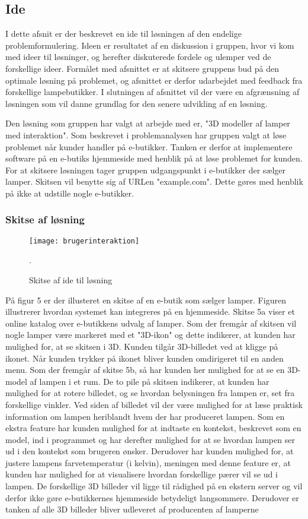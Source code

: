 \subsection{Ide}

I dette afsnit er der beskrevet en ide til løsningen af den endelige problemformulering. Ideen er resultatet af en diskussion i gruppen, hvor vi kom med ideer til løsninger, og herefter diskuterede fordele og ulemper ved de forskellige ideer. Formålet med afsnittet er at skitsere gruppens bud på den optimale løsning på problemet, og afsnittet er derfor udarbejdet med feedback fra forskellige lampebutikker. I slutningen af afsnittet vil der være en afgrænsning af løsningen som vil danne grundlag for den senere udvikling af en løsning.

Den løsning som gruppen har valgt at arbejde med er, "3D modeller af lamper med interaktion". Som beskrevet i problemanalysen har gruppen valgt at løse problemet når kunder handler på e-butikker. Tanken er derfor at implementere software på en e-butiks hjemmeside med henblik på at løse problemet for kunden. For at skitsere løsningen tager gruppen udgangspunkt i e-butikker der sælger lamper. Skitsen vil benytte sig af URLen "example.com". Dette gøres med henblik på ikke at udstille nogle e-butikker.

\subsubsection{Skitse af løsning}

\begin{figure}[H]
   \centering
   \texttt{[image: brugerinteraktion]}
   \caption{Skitse af ide til løsning}.
\end{figure}

På figur 5 er der illusteret en skitse af en e-butik som sælger lamper. Figuren illustrerer hvordan systemet kan integreres på en hjemmeside. Skitse 5a viser et online katalog over e-butikkens udvalg af lamper. Som der fremgår af skitsen vil nogle lamper være markeret med et "3D-ikon" og dette indikerer, at kunden har mulighed for, at se skitsen i 3D. Kunden tilgår 3D-billedet ved at kligge på ikonet. Når kunden trykker på ikonet bliver kunden omdirigeret til en anden menu. Som der fremgår af skitse 5b, så har kunden her mulighed for at se en 3D-model af lampen i et rum. De to pile på skitsen indikerer, at kunden har mulighed for at rotere billedet, og se hvordan belysningen fra lampen er, set fra forskellige vinkler. Ved siden af billedet vil der være mulighed for at læse praktisk information om lampen heriblandt hvem der har produceret lampen. Som en ekstra feature har kunden mulighed for at indtaste en kontekst, beskrevet som en model, ind i programmet og har derefter mulighed for at se hvordan lampen ser ud i den kontekst som brugeren ønsker. Derudover har kunden mulighed for, at justere lampens farvetemperatur (i kelvin), meningen med denne feature er, at kunden har mulighed for at visualisere hvordan forskellige pærer vil se ud i lampen. De forskellige 3D billeder vil ligge til rådighed på en ekstern server og vil derfor ikke gøre e-butikkernes hjemmeside betydeligt langsommere. Derudover er tanken af alle 3D billeder bliver udleveret af producenten af lamperne 

